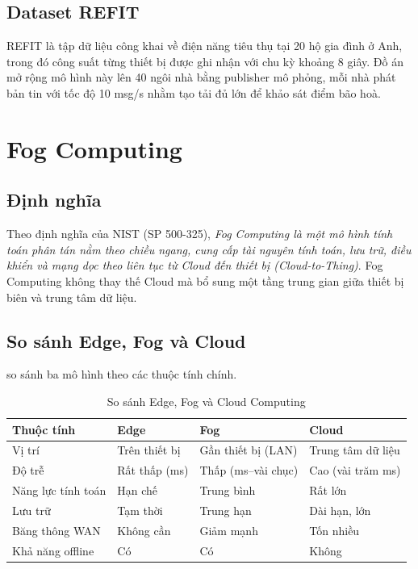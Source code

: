 \documentclass[13pt,a4paper]{report}
\begin{document}
\subsection{Dataset REFIT}

REFIT là tập dữ liệu công khai về điện năng tiêu thụ tại 20 hộ gia đình ở Anh,
trong đó công suất từng thiết bị được ghi nhận với chu kỳ khoảng 8 giây. Đồ án
mở rộng mô hình này lên 40 ngôi nhà bằng publisher mô phỏng, mỗi nhà phát bản tin
với tốc độ 10 msg/s nhằm tạo tải đủ lớn để khảo sát điểm bão hoà.

\section{Fog Computing}

\subsection{Định nghĩa}

Theo định nghĩa của NIST (SP 500-325), \textit{Fog Computing là một mô hình tính
toán phân tán nằm theo chiều ngang, cung cấp tài nguyên tính toán, lưu trữ, điều
khiển và mạng dọc theo liên tục từ Cloud đến thiết bị (Cloud-to-Thing)}. Fog
Computing không thay thế Cloud mà bổ sung một tầng trung gian giữa thiết bị biên
và trung tâm dữ liệu.

\subsection{So sánh Edge, Fog và Cloud}

 so sánh ba mô hình theo các thuộc tính chính.

\begin{table}[H]
\centering
\caption{So sánh Edge, Fog và Cloud Computing}
\label{tab:edge-fog-cloud}
\begin{tabular}{p{} p{} p{} p{}}
\toprule
\textbf{Thuộc tính} & \textbf{Edge} & \textbf{Fog} & \textbf{Cloud} \\
\midrule
Vị trí          & Trên thiết bị      & Gần thiết bị (LAN)  & Trung tâm dữ liệu \\
Độ trễ          & Rất thấp (ms)      & Thấp (ms--vài chục) & Cao (vài trăm ms) \\
Năng lực tính toán & Hạn chế         & Trung bình          & Rất lớn \\
Lưu trữ         & Tạm thời          & Trung hạn           & Dài hạn, lớn \\
Băng thông WAN  & Không cần         & Giảm mạnh           & Tốn nhiều \\
Khả năng offline & Có               & Có                  & Không \\
\bottomrule
\end{tabular}
\end{table}
\end{document}
